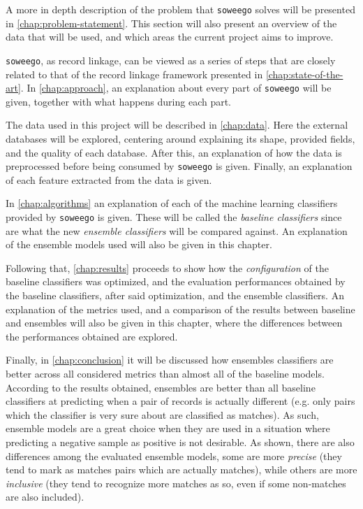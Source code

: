 \documentclass[epsfig,a4paper,11pt,titlepage,twoside,openany]{book}
\newcommand{\soweego}[0]{\texttt{soweego}\xspace}
\begin{document}
A more in depth description of the problem that \soweego solves will be presented in \autoref{chap:problem-statement}. This section will also present an overview of the data that will be used, and which areas the current project aims to improve.

\soweego, as record linkage, can be viewed as a series of steps that are closely related to that of the record linkage framework presented in \autoref{chap:state-of-the-art}. In \autoref{chap:approach}, an explanation about every part of \soweego will be given, together with what happens during each part. 

The data used in this project will be described in \autoref{chap:data}. Here the external databases will be explored, centering around explaining its shape, provided fields, and the quality of each database. After this, an explanation of how the data is preprocessed before being consumed by \soweego is given. Finally, an explanation of each feature extracted from the data is given.

In \autoref{chap:algorithms} an explanation of each of the machine learning classifiers provided by \soweego is given. These will be called the \textit{baseline classifiers} since are what the new \textit{ensemble classifiers} will be compared against. An explanation of the ensemble models used will also be given in this chapter.

Following that, \autoref{chap:results} proceeds to show how the \textit{configuration} of the baseline classifiers was optimized, and the evaluation performances obtained by the baseline classifiers, after said optimization, and the ensemble classifiers. An explanation of the metrics used, and a comparison of the results between baseline and ensembles will also be given in this chapter, where the differences between the performances obtained are explored.

Finally, in \autoref{chap:conclusion} it will be discussed how ensembles classifiers are better across all considered metrics than almost all of the baseline models. According to the results obtained, ensembles are better than all baseline classifiers at predicting when a pair of records is actually different (e.g. only pairs which the classifier is very sure about are classified as matches). As such, ensemble models are a great choice when they are used in a situation where predicting a negative sample as positive is not desirable. As shown, there are also differences among the evaluated ensemble models, some are more \textit{precise} (they tend to mark as matches pairs which are actually matches), while others are more \textit{inclusive} (they tend to recognize more matches as so, even if some non-matches are also included). 
\end{document}
